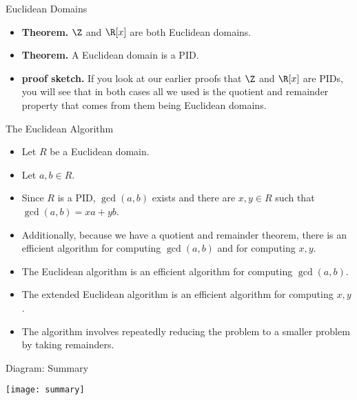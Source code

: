 \documentclass[handout]{beamer}
\begin{document}

\begin{frame}{Euclidean Domains}

\begin{itemize}
  \item \textbf{Theorem.} $\Z$ and $\R[x]$ are both Euclidean domains.
  \item \textbf{Theorem.} A Euclidean domain is a PID.
  \item \textbf{proof sketch.} If you look at our earlier proofs that $\Z$ and $\R[x]$
  are PIDs, you will see that in both cases all we used is the quotient and remainder property
  that comes from them being Euclidean domains.
\end{itemize}

\end{frame}



\begin{frame}{The Euclidean Algorithm}

\begin{itemize}
  \item Let $R$ be a Euclidean domain.
  \item Let $a,b \in R$.
  \item Since $R$ is a PID, $\gcd(a,b)$ exists and there are $x,y\in R$ such that $\gcd(a,b) = xa + yb$.
  \item Additionally, because we have a quotient and remainder theorem, there is an efficient algorithm for
  computing $\gcd(a,b)$ and for computing $x,y$.
  \item The Euclidean algorithm is an efficient algorithm for computing $\gcd(a,b)$.
  \item The extended Euclidean algorithm is an efficient algorithm for computing $x,y$.
  \item The algorithm involves repeatedly reducing the problem to a smaller problem by taking remainders.
\end{itemize}

\end{frame}



\begin{frame}{Diagram: Summary}

\begin{center}
\texttt{[image: summary]}
\end{center}

\end{frame}



\end{document}
